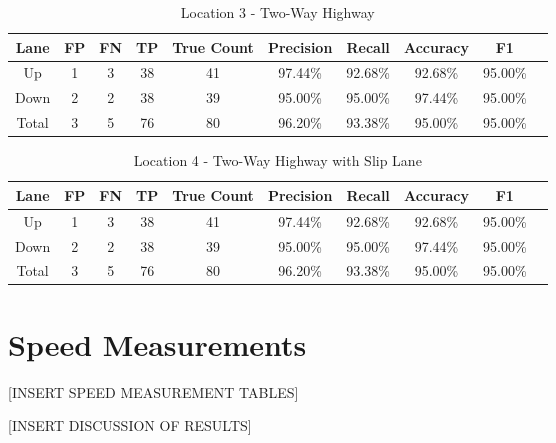 \begin{table}
    \centering
    \begin{tabular}{|c|c|c|c|c|c|c|c|c|c|} 
        \hline
        \textbf{Lane} & \textbf{FP} & \textbf{FN}& \textbf{TP}& \textbf{True Count}& 
        \textbf{Precision}& \textbf{Recall}& \textbf{Accuracy} & \textbf{F1}\\
        \hline
        Up&1&3&38&41&97.44\%&92.68\%&92.68\%&95.00\%\\
        \hline
        Down&2&2&38&39&95.00\%&95.00\%&97.44\%&95.00\%\\
        \hline
        Total&3&5&76&80&96.20\%&93.38\%&95.00\%&95.00\%\\
        \hline
    \end{tabular}
    \caption{Location 3 - Two-Way Highway}
    \end{table}

\begin{table}
    \centering
    \begin{tabular}{|c|c|c|c|c|c|c|c|c|c|} 
        \hline
        \textbf{Lane} & \textbf{FP} & \textbf{FN}& \textbf{TP}& \textbf{True Count}& 
        \textbf{Precision}& \textbf{Recall}& \textbf{Accuracy} & \textbf{F1}\\
        \hline
        Up&1&3&38&41&97.44\%&92.68\%&92.68\%&95.00\%\\
        \hline
        Down&2&2&38&39&95.00\%&95.00\%&97.44\%&95.00\%\\
        \hline
        Total&3&5&76&80&96.20\%&93.38\%&95.00\%&95.00\%\\
        \hline
    \end{tabular}
    \caption{Location 4 - Two-Way Highway with Slip Lane}
\end{table}




\section{Speed Measurements}

[INSERT SPEED MEASUREMENT TABLES]

[INSERT DISCUSSION OF RESULTS]

